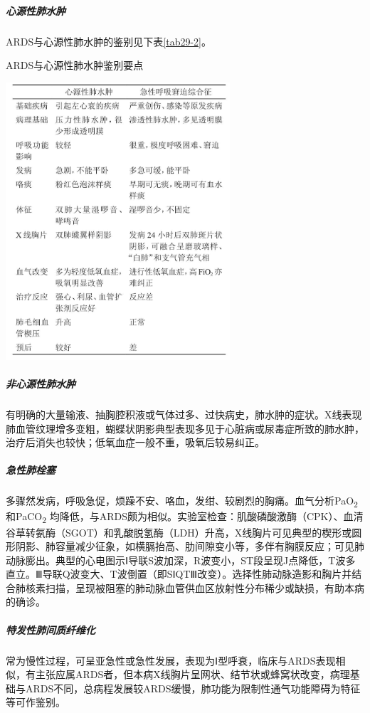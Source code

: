 \subparagraph{心源性肺水肿}

ARDS与心源性肺水肿的鉴别见下表\ref{tab29-2}。

\begin{table}[htbp]
\centering
\caption{ARDS与心源性肺水肿鉴别要点}
\label{tab29-2}
\includegraphics[width=3.28125in,height=4.0625in]{./images/Image00115.jpg}
\end{table}

\subparagraph{非心源性肺水肿}

有明确的大量输液、抽胸腔积液或气体过多、过快病史，肺水肿的症状。X线表现肺血管纹理增多变粗，蝴蝶状阴影典型表现多见于心脏病或尿毒症所致的肺水肿，治疗后消失也较快；低氧血症一般不重，吸氧后较易纠正。

\subparagraph{急性肺栓塞}

多骤然发病，呼吸急促，烦躁不安、咯血，发绀、较剧烈的胸痛。血气分析PaO\textsubscript{2}
和PaCO\textsubscript{2}
均降低，与ARDS颇为相似。实验室检查：肌酸磷酸激酶（CPK）、血清谷草转氨酶（SGOT）和乳酸脱氢酶（LDH）升高，X线胸片可见典型的楔形或圆形阴影、肺容量减少征象，如横膈抬高、肋间隙变小等，多伴有胸膜反应；可见肺动脉膨出。典型的心电图示Ⅰ导联S波加深，R波变小，ST段呈现J点降低，T波多直立。Ⅲ导联Q波变大、T波倒置（即SⅠQTⅢ改变）。选择性肺动脉造影和胸片并结合肺核素扫描，呈现被阻塞的肺动脉血管供血区放射性分布稀少或缺损，有助本病的确诊。

\subparagraph{特发性肺间质纤维化}

常为慢性过程，可呈亚急性或急性发展，表现为Ⅰ型呼衰，临床与ARDS表现相似，有主张应属ARDS者，但本病X线胸片呈网状、结节状或蜂窝状改变，病理基础与ARDS不同，总病程发展较ARDS缓慢，肺功能为限制性通气功能障碍为特征等可作鉴别。

